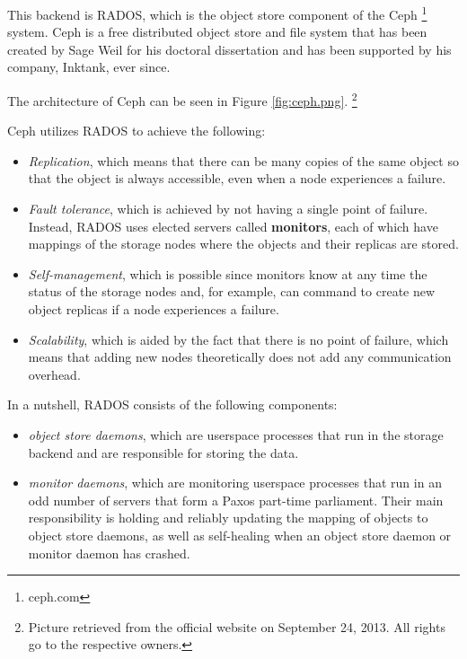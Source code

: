 This backend is RADOS\cite{rados}, which is the object store component of the 
Ceph \footnote{ceph.com} system. Ceph is a free distributed object store and 
file system that has been created by Sage Weil for his doctoral dissertation
\cite{weil-thesis} and has been supported by his company, Inktank, ever since.

The architecture of Ceph can be seen in Figure \ref{fig:ceph.png}.
\footnote{Picture retrieved from the official website on September 24, 2013.  
	All rights go to the respective owners.}


Ceph utilizes RADOS to achieve the following:

\begin{itemize}
	\item \textit{Replication}, which means that there can be many copies 
		of the same object so that the object is always accessible, 
		even when a node experiences a failure.
	\item \textit{Fault tolerance}, which is achieved by not having a 
		single point of failure. Instead, RADOS uses elected servers 
		called \textbf{monitors}, each of which have mappings of the 
		storage nodes where the objects and their replicas are stored.  
	\item \textit{Self-management}, which is possible since monitors know 
		at any time the status of the storage nodes and, for example, 
		can command to create new object replicas if a node experiences 
		a failure.
	\item \textit{Scalability}, which is aided by the fact that there is no 
		point of failure, which means that adding new nodes 
		theoretically does not add any communication overhead.
\end{itemize}

In a nutshell, RADOS consists of the following components:

\begin{itemize}
	\item \textit{object store daemons}, which are userspace processes that run 
		in the storage backend and are responsible for storing the data.
	\item \textit{monitor daemons}, which are monitoring userspace processes 
		that run in an odd number of servers that form a Paxos part-time 
		parliament\cite{Paxos}. Their main responsibility is holding and 
		reliably updating the mapping of objects to object store daemons, as 
		well as self-healing when an object store daemon or monitor daemon has 
		crashed.
\end{itemize}

